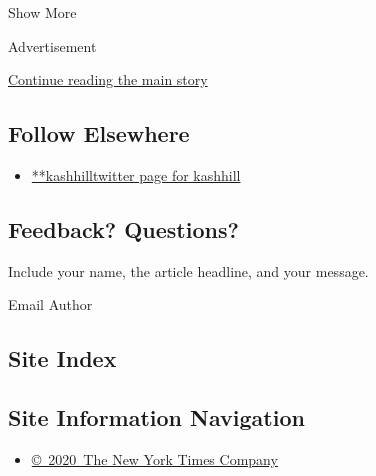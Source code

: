 Show More

Advertisement

\protect\hyperlink{after-mid2}{Continue reading the main story}

\hypertarget{follow-elsewhere}{%
\subsection{Follow Elsewhere}\label{follow-elsewhere}}

\begin{itemize}
\tightlist
\item
  \href{https://twitter.com/kashhill}{**kashhilltwitter page for
  kashhill}
\end{itemize}

\hypertarget{feedback-questions}{%
\subsection{Feedback? Questions?}\label{feedback-questions}}

Include your name, the article headline, and your message.

Email Author

\hypertarget{site-index}{%
\subsection{Site Index}\label{site-index}}

\hypertarget{site-information-navigation}{%
\subsection{Site Information
Navigation}\label{site-information-navigation}}

\begin{itemize}
\tightlist
\item
  \href{https://help.nytimes3xbfgragh.onion/hc/en-us/articles/115014792127-Copyright-notice}{©~2020~The
  New York Times Company}
\end{itemize}

